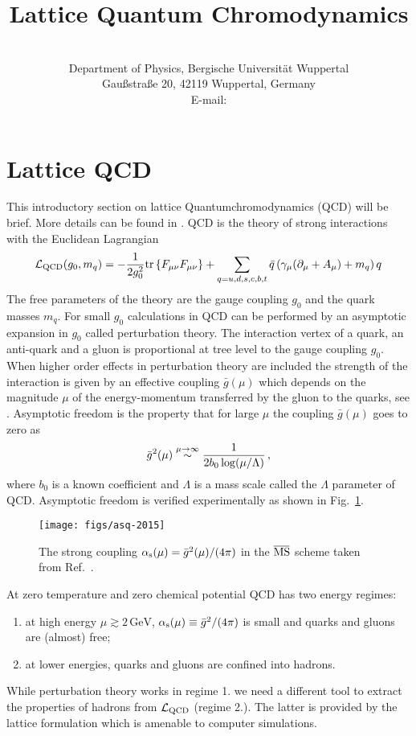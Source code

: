 \documentclass{PoS}
\title{Lattice Quantum Chromodynamics}
\author{\speaker{Francesco Knechtli}%
        \\
        Department of Physics, Bergische Universit\"at Wuppertal\\
        Gau\ss{}stra\ss{}e 20, 42119 Wuppertal, Germany\\
        E-mail: \email{knechtli@physik.uni-wuppertal.de}}
\newcommand{\fig}[1]{Fig.~\ref{#1}}
\newcommand{\lag}[1]{{\mathcal{L}}_{\rm {#1}}}
\newcommand{\tr}{\mathrm{tr}\,}
\newcommand{\gbar}{\bar{g}}
\newcommand{\msbar}{{\rm \overline{MS\kern-0.05em}\kern0.05em}}
\begin{document}
\section{Lattice QCD}

This introductory section on lattice Quantumchromodynamics (QCD) will be brief.
More details can be found in \cite{Knechtli:2017sna}.
QCD is the theory of strong interactions with the Euclidean Lagrangian
\begin{equation}\label{e:lagQCD}
 \lag{QCD}(g_0,m_q) = -\frac{1}{2g_0^2}\tr\{F_{\mu\nu}F_{\mu\nu}\} +
 \sum_{q=u,d,s,c,b,t} \bar{q}\,(\gamma_\mu(\partial_\mu + A_\mu) + m_q)\,q
\end{equation}
The free parameters of the theory are the gauge coupling $g_0$ and the 
quark masses $m_q$.
For small $g_0$ calculations in QCD can be performed by an asymptotic expansion
in $g_0$ called perturbation theory. 
The interaction vertex of a quark, an anti-quark and a gluon is proportional 
at tree level to the gauge coupling $g_0$. When higher order effects in 
perturbation theory are included the strength of the interaction is given
by an effective coupling $\gbar(\mu)$ which depends on the 
magnitude $\mu$ of the energy-momentum transferred by the gluon to the quarks,
see \cite{Luscher:2002pz}.
Asymptotic freedom is the property that for large $\mu$ the coupling 
$\gbar(\mu)$ goes to zero as \cite{Gross:1973id,Politzer:1973fx}
\begin{equation}\label{e:afree}
  {\bar g}^2(\mu) \buildrel \mu\rightarrow\infty\over\sim
  \frac{1}{2b_0\log(\mu/\Lambda)} \,,
\end{equation}
where $b_0$ is a known coefficient and $\Lambda$ is a mass scale called the
$\Lambda$ parameter of QCD. Asymptotic freedom is verified 
experimentally as shown in \fig{f:asq}.
%
\begin{figure}[t]\centering
\texttt{[image: figs/asq-2015]}
\caption{The strong coupling $\alpha_{\rm s}(\mu)=\gbar^2(\mu)/(4\pi)$ in the $\msbar$ scheme taken from Ref.~\cite{Olive:2016xmw}.}
  \label{f:asq}
\end{figure}
%

At zero temperature and zero chemical potential QCD has two energy regimes:
\begin{enumerate}
\item at high energy $\mu\gtrsim2\,\mathrm{GeV}$, $\alpha_{\rm s}(\mu)\equiv \gbar^2/(4\pi)$ is small and quarks and gluons are (almost) free;
\item at lower energies, quarks and gluons are confined into hadrons.
\end{enumerate}
While perturbation theory works in regime 1. we need a different tool to extract
the properties of hadrons from $\lag{QCD}$ (regime 2.). The latter is provided
by the lattice formulation which is amenable to computer simulations.
\end{document}
